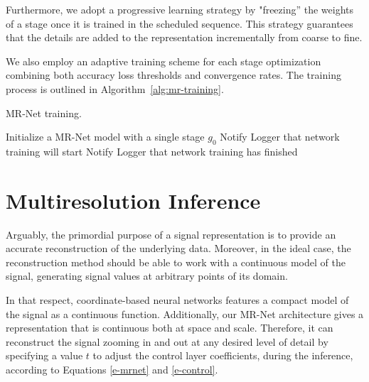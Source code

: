 Furthermore, we adopt a progressive learning strategy by "freezing” the weights of a stage once it is trained in the scheduled sequence. This strategy guarantees that the details are added to the representation incrementally from coarse to fine.

We also employ an adaptive training scheme for each stage optimization combining both accuracy loss thresholds and convergence rates. The training process is outlined in Algorithm~\ref{alg:mr-training}.

\begin{algorithm}[hbt!]
\caption{MR-Net training.} \label{alg:mr-training}
    Initialize a MR-Net model with a single stage $g_0$\;
    Notify Logger that network training will start\;
    Notify Logger that network training has finished\;
\end{algorithm}

\pagebreak

\section{Multiresolution Inference}

Arguably, the primordial purpose of a signal representation is to provide an accurate reconstruction of the underlying data. Moreover, in the ideal case, the reconstruction method should be able to work with a continuous model of the signal, generating signal values at arbitrary points of its domain.

In that respect, coordinate-based neural networks features a compact model of the signal as a continuous function. Additionally, our MR-Net architecture gives a representation that is continuous both at space and scale. 
Therefore, it can reconstruct the signal zooming in and out at any desired level of detail by specifying a value $t$ to adjust the control layer coefficients, during the inference, according to Equations \ref{e-mrnet} and \ref{e-control}.

